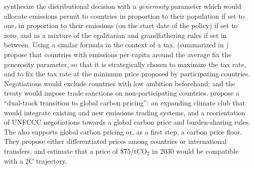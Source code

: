 \citet{gollier_negotiating_2015} synthesize the distributional decision with a \textit{generosity} parameter which would allocate emissions permit to countries in proportion to their population if set to one, in proportion to their emissions (on the start date of the policy) if set to zero, and as a mixture of the egalitarian and grandfathering rules if set in between. Using a similar formula in the context of a tax, \citet{cramton_international_2015} (summarized in \citealp{mackay_price_2015}) propose that countries with emissions per capita around the average fix the generosity parameter, so that it is strategically chosen to maximize the tax rate, and to fix the tax rate at the minimum price proposed by participating countries. Negotiations would exclude countries with low ambition beforehand; and the treaty would impose trade sanctions on non-participating countries. %
\citet{bergh_dual-track_2020} propose a ``dual-track transition to global carbon pricing'': an expanding climate club that would integrate existing and new emissions trading systems, and a reorientation of UNFCCC negotiations towards a global carbon price and burden-sharing rules. 
The \citet{imf_how_2019} also supports global carbon pricing or, as a first step, a carbon price floor. They propose either differentiated prices among countries or international transfers, and estimate that a price of \$75/tCO$_\text{2}$ in 2030 would be compatible with a 2\textdegree{}C trajectory. %

